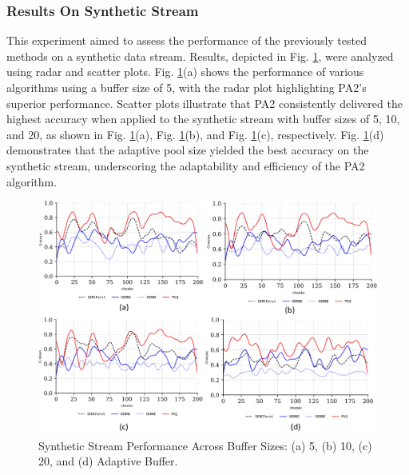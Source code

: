 \subsubsection{Results On Synthetic Stream}
\label{sec:synthetic}
This experiment aimed to assess the performance of the previously tested methods on a synthetic data stream. Results, depicted in Fig. \ref{fig:res3}, were analyzed using radar and scatter plots. Fig. \ref{fig:res3}(a) shows the performance of various algorithms using a buffer size of 5, with the radar plot highlighting PA2's superior performance. Scatter plots illustrate that PA2 consistently delivered the highest accuracy when applied to the synthetic stream with buffer sizes of 5, 10, and 20, as shown in Fig. \ref{fig:res3}(a), Fig. \ref{fig:res3}(b), and Fig. \ref{fig:res3}(c), respectively. Fig. \ref{fig:res3}(d) demonstrates that the adaptive pool size yielded the best accuracy on the synthetic stream, underscoring the adaptability and efficiency of the PA2 algorithm.

\begin{figure}[!ht]
	\centering
	\includegraphics[width=1\linewidth]{5_Emerging/images/res3.png}
	\caption{Synthetic Stream Performance Across Buffer Sizes: (a) 5, (b) 10, (c) 20, and (d) Adaptive Buffer.}

	\label{fig:res3}
\end{figure}				


